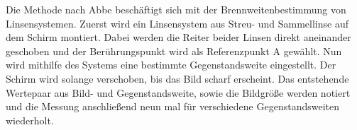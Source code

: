 Die Methode nach Abbe beschäftigt sich mit der Brennweitenbestimmung von Linsensystemen.
Zuerst wird ein Linsensystem aus Streu- und Sammellinse auf
dem Schirm montiert. Dabei werden die Reiter beider Linsen direkt aneinander
geschoben und der Berührungspunkt wird als Referenzpunkt A gewählt. Nun wird
mithilfe des Systems eine bestimmte Gegenstandsweite eingestellt. Der Schirm wird
solange verschoben, bis das Bild scharf erscheint. Das entstehende Wertepaar aus
Bild- und Gegenstandsweite, sowie die Bildgröße werden notiert und die Messung
anschließend neun mal für verschiedene Gegenstandsweiten wiederholt.
